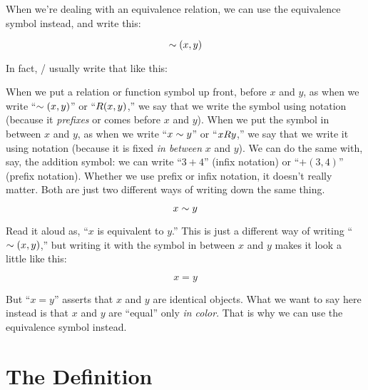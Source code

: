 \documentclass[../../../main.tex]{subfiles}
\begin{document}
When we're dealing with an equivalence relation, we can use the equivalence symbol instead, and write this:

\begin{equation*}
  \equivalence/(x, y)
\end{equation*}

In fact, \mathers/ usually write that like this:

\begin{aside}
  \begin{remark}
    When we put a relation or function symbol up front, before $x$ and $y$, as when we write ``$\equivalence/(x, y)$'' or ``$R(x, y)$,'' we say that we write the symbol using  notation (because it \emph{prefixes} or comes before $x$ and $y$). When we put the symbol in between $x$ and $y$, as when we write ``$x \equivalence/ y$'' or ``$x R y$,'' we say that we write it using  notation (because it is fixed \emph{in between} $x$ and $y$). We can do the same with, say, the addition symbol: we can write ``$3 + 4$'' (infix notation) or ``$+(3, 4)$'' (prefix notation). Whether we use prefix or infix notation, it doesn't really matter. Both are just two different ways of writing down the same thing.
  \end{remark}
\end{aside}

\begin{equation*}
  x \equivalence/ y
\end{equation*}

Read it aloud as, ``$x$ is equivalent to $y$.'' This is just a different way of writing ``$\equivalence/(x, y)$,'' but writing it with the symbol in between $x$ and $y$ makes it look a little like this:

\begin{equation*}
  x = y
\end{equation*}

But ``$x = y$'' asserts that $x$ and $y$ are identical objects. What we want to say here instead is that $x$ and $y$ are ``equal'' only \emph{in color}. That is why we can use the equivalence symbol instead.


\section{The Definition}
\end{document}
